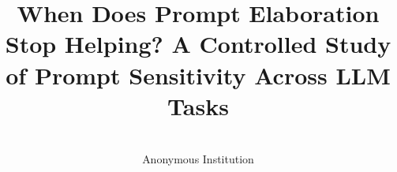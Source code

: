 \documentclass[wcp]{jmlr}
\title[Prompt Elaboration]{When Does Prompt Elaboration Stop Helping?
       A Controlled Study of Prompt Sensitivity Across LLM Tasks}
\author{\Name{Anonymous Author(s)} \Email{anonymous@example.com}\\
\addr Anonymous Institution}
\begin{document}
\makeatletter
\let \@jmlrpages \@empty
\makeatother

\maketitle











\appendix

\end{document}
